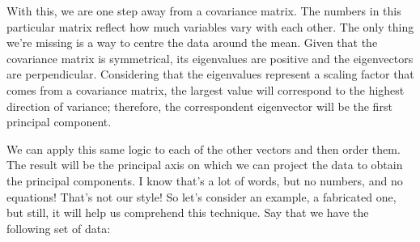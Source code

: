 \documentclass[a4,12pt,twosided,openany]{memoir}
\begin{document}
\par 
\indent
With this, we are one step away from a covariance matrix. The numbers in this particular matrix reflect how much variables vary with each other. The only thing we’re missing is a way to centre the data around the mean. Given that the covariance matrix is symmetrical, its eigenvalues are positive and the eigenvectors are perpendicular. Considering that the eigenvalues represent a scaling factor that comes from a covariance matrix, the largest value will correspond to the highest direction of variance; therefore, the correspondent eigenvector will be the first principal component.
\par 
\indent
We can apply this same logic to each of the other vectors and then order them. The result will be the principal axis on which we can project the data to obtain the principal components. I know that’s a lot of words, but no numbers, and no equations! That’s not our style! So let’s consider an example, a fabricated one, but still, it will help us comprehend this technique. Say that we have the following set of data:
\end{document}
